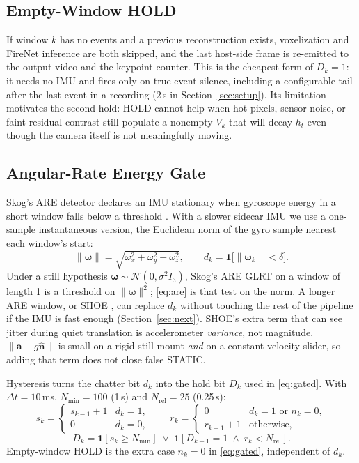 \documentclass[journal]{IEEEtran}
\DeclareRobustCommand{\norm}[1]{\lVert #1 \rVert}
\begin{document}
\subsection{Empty-Window HOLD}
If window \(k\) has no events and a previous reconstruction exists, voxelization
and FireNet inference are both skipped, and the last host-side frame is
re-emitted to the output video and the keypoint counter. This is the cheapest
form of \(D_k = 1\): it needs no IMU and fires only on true event silence,
including a configurable tail after the last event in a recording (2\,s in
Section~\ref{sec:setup}). Its limitation motivates the second hold: HOLD cannot
help when hot pixels, sensor noise, or faint residual contrast still populate a
nonempty \(V_k\) that will decay \(h_t\) even though the camera itself is not
meaningfully moving.

\subsection{Angular-Rate Energy Gate}
\label{sec:are}
Skog's ARE detector declares an IMU stationary when gyroscope energy in a short
window falls below a threshold \cite{skog2010tbe}. With a slower sidecar IMU we
use a one-sample instantaneous version, the Euclidean norm of the gyro sample
nearest each window's start:
\begin{equation}
\label{eq:are}
\norm{\boldsymbol{\omega}} = \sqrt{\omega_x^2 + \omega_y^2 + \omega_z^2},
\qquad
d_k = \mathbf{1}\bigl[\norm{\boldsymbol{\omega}_k} < \delta\bigr].
\end{equation}
Under a still hypothesis \(\boldsymbol{\omega}\sim\mathcal{N}(0,\sigma^2 I_3)\),
Skog's ARE GLRT on a window of length 1 is a threshold on
\(\norm{\boldsymbol{\omega}}^2\); \eqref{eq:are} is that test on the norm. A longer
ARE window, or SHOE \cite{skog2010tbe}, can replace \(d_k\) without touching
the rest of the pipeline if the IMU is fast enough (Section~\ref{sec:next}).
SHOE's extra term that can see jitter during quiet translation is accelerometer
\emph{variance}, not magnitude. \(\norm{\mathbf{a}-g\hat{\mathbf{n}}}\) is small
on a rigid still mount \emph{and} on a constant-velocity slider, so adding that
term does not close false STATIC.

Hysteresis turns the chatter bit \(d_k\) into the hold bit \(D_k\) used in
\eqref{eq:gated}. With \(\Delta t = 10\)\,ms, \(N_{\min}=100\) (1\,s) and
\(N_{\mathrm{rel}}=25\) (0.25\,s):
\begin{equation}
\label{eq:hyst}
s_k =
\begin{cases}
s_{k-1}+1 & d_k=1,\\
0 & d_k=0,
\end{cases}
\qquad
r_k =
\begin{cases}
0 & d_k=1 \text{ or } n_k=0,\\
r_{k-1}+1 & \text{otherwise,}
\end{cases}
\end{equation}
\begin{equation}
D_k = \mathbf{1}[s_k \ge N_{\min}]
\;\lor\;
\mathbf{1}[D_{k-1}=1 \;\wedge\; r_k < N_{\mathrm{rel}}].
\end{equation}
Empty-window HOLD is the extra case \(n_k=0\) in \eqref{eq:gated}, independent
of \(d_k\).
\end{document}
